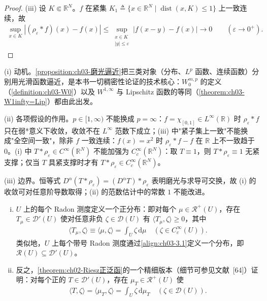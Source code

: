 \documentclass[../../main.tex]{subfiles}%
\begin{document}
\begin{proof}
(iii) 设 $K\Subset\mathbb{R}^N$。$f$ 在紧集 $K_1\triangleq\{x\in\mathbb{R}^N\mid\operatorname{dist}(x,K)\leqslant1\}$ 上一致连续，故
\begin{align*}
\sup_{x\in K}|(\rho_\varepsilon*f)(x)-f(x)|\leqslant\sup_{\substack{x\in K\\|y|\leqslant\varepsilon}}|f(x-y)-f(x)|\to0\qquad(\varepsilon\to0^+).
\end{align*}
\end{proof}

\begin{remark}\label{remark:ch03-磨光动机}
(i) 动机。\cref{proposition:ch03-磨光逼近}把三类对象（分布、$L^p$ 函数、连续函数）分别用光滑函数逼近，是本书一切稠密性论证的技术核心：$W^{m,p}_0$ 的定义（\cref{definition:ch03-W0}）以及 $W^{1,\infty}$ 与 Lipschitz 函数的等同（\cref{theorem:ch03-W1infty=Lip}）都由此出发。

(ii) 各项假设的作用。$p\in[1,\infty)$ 不能换成 $p=\infty$：$f=\chi_{[0,1]}\in L^\infty(\mathbb{R})$ 时 $\rho_\varepsilon*f$ 只在弱*意义下收敛，收敛不在 $L^\infty$ 范数下成立；(iii) 中"紧子集上一致"不能换成"全空间一致"，除非 $f$ 一致连续：$f(x)=x^2$ 时 $\rho_\varepsilon*f-f$ 在 $\mathbb{R}$ 上不一致趋于 $0$。(i) 中 $T*\rho_\varepsilon\in C^\infty(\mathbb{R}^N)$ 不能加强为 $C^\infty_c(\mathbb{R}^N)$：取 $T\equiv1$，则 $T*\rho_\varepsilon\equiv1$ 无紧支撑；仅当 $T$ 具紧支撑时才有 $T*\rho_\varepsilon\in C^\infty_c(\mathbb{R}^N)$。

(iii) 边界。恒等式 $D^\alpha(T*\rho_\varepsilon)=(D^\alpha T)*\rho_\varepsilon$ 表明磨光与求导可交换，故 (i) 的收敛可对任意阶导数取得；(ii) 的范数估计中的常数 $1$ 不能改进。
\end{remark}

\begin{remark}\label{remark:ch03-Radon即分布}
\begin{enumerate}[(i)]
\item $U$ 上的每个 Radon 测度定义一个正分布：即对每个 $\mu\in\mathscr{R}^+(U)$，存在 $T_\mu\in\mathcal{D}'(U)$ 使对任意非负 $\zeta\in\mathcal{D}(U)$ 有 $\langle T_\mu,\zeta\rangle\geqslant0$，其中
\begin{align}
\langle T_\mu,\zeta\rangle\equiv\langle\mu,\zeta\rangle=\int_U\zeta\,\mathrm{d}\mu
\quad (\zeta\in C^\infty_c(U)).\label{align:ch03-3.1}
\end{align}
类似地，$U$ 上每个带号 Radon 测度通过\eqref{align:ch03-3.1}定义一个分布，即 $\mathscr{R}(U)\subseteq\mathcal{D}'(U)$。
\item 反之，\cref{theorem:ch02-Riesz正泛函}的一个精细版本（细节可参见文献~[64]）证明：对每个正的 $T\in\mathcal{D}'(U)$，存在 $\mu_T\in\mathscr{R}^+(U)$ 使
\begin{align*}
\langle T,\zeta\rangle=\langle\mu_T,\zeta\rangle=\int_U\zeta\,\mathrm{d}\mu_T
\quad (\zeta\in\mathcal{D}(U)).
\end{align*}
\end{enumerate}
\end{remark}
\end{document}
